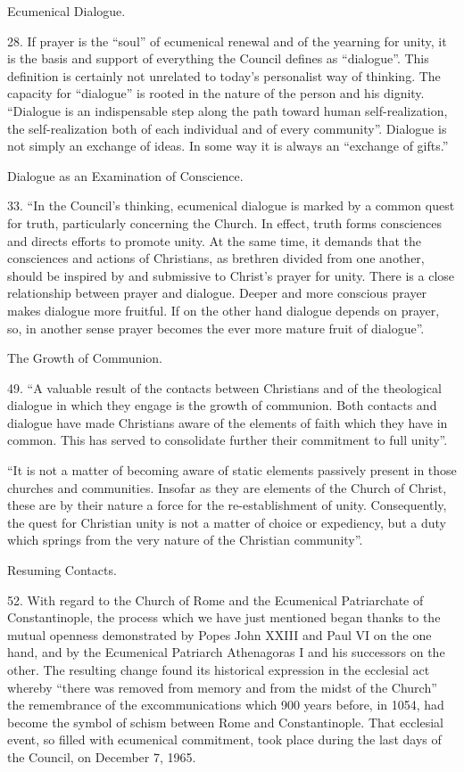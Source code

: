\documentclass[oneside]{book}
\begin{document}
Ecumenical Dialogue. 

28.  If prayer is the ``soul'' of ecumenical renewal and of the yearning for
unity, it is the basis and support of everything the Council defines as
``dialogue''. This definition is certainly not unrelated to today's personalist
way of thinking. The capacity for ``dialogue'' is rooted in the nature of the
person and his dignity.  ``Dialogue is an indispensable step along the path
toward human self-realization, the self-realization both of each individual and
of every community''. Dialogue is not simply an exchange of ideas. In some way
it is always an ``exchange of gifts.''

Dialogue as an Examination of Conscience.

33. ``In the Council's thinking, ecumenical dialogue is marked by a common quest
for truth, particularly concerning the Church. In effect, truth forms
consciences and directs efforts to promote unity. At the same time, it demands
that the consciences and actions of Christians, as brethren divided from one
another, should be inspired by and submissive to Christ's prayer for
unity. There is a close relationship between prayer and dialogue. Deeper and
more conscious prayer makes dialogue more fruitful. If on the other hand
dialogue depends on prayer, so, in another sense prayer becomes the ever more
mature fruit of dialogue''.

The Growth of Communion.

49. ``A valuable result of the contacts between Christians and of the
theological dialogue in which they engage is the growth of communion. Both
contacts and dialogue have made Christians aware of the elements of faith which
they have in common. This has served to consolidate further their commitment to
full unity''. 

``It is not a matter of becoming aware of static elements passively present in
those churches and communities. Insofar as they are elements of the Church of
Christ, these are by their nature a force for the re-establishment of
unity. Consequently, the quest for Christian unity is not a matter of choice or
expediency, but a duty which springs from the very nature of the Christian community''.

Resuming Contacts. 

52.  With regard to the Church of Rome and the Ecumenical Patriarchate of
Constantinople, the process which we have just mentioned began thanks to the
mutual openness demonstrated by Popes John XXIII and Paul VI on the one hand,
and by the Ecumenical Patriarch Athenagoras I and his successors on the
other. The resulting change found its historical expression in the ecclesial act
whereby ``there was removed from memory and from the midst of the Church'' the
remembrance of the excommunications which 900 years before, in 1054, had become
the symbol of schism between Rome and Constantinople. That ecclesial event, so
filled with ecumenical commitment, took place during the last days of the
Council, on December 7, 1965.
\end{document}
